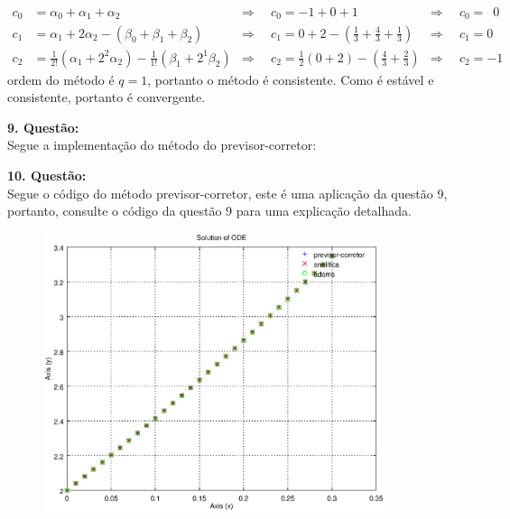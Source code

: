\documentclass[a4paper,12pt]{article}
\begin{document}
	\begin{align*}
		c_{0} &= \alpha_{0} + \alpha_{1} + \alpha_{2} &\Rightarrow \hspace{6pt} &c_{0} = -1 + 0 + 1 &\Rightarrow
		\hspace{2pt} &c_{0} =
		\hspace{6pt}0\\
		c_{1} &= \alpha_{1} + 2\alpha_{2} -(\beta_{0} + \beta_{1} + \beta_{2}) &\Rightarrow \hspace{6pt} &c_{1} = 0 +
		2 - (\frac{1}{3} + \frac{4}{3} + \frac{1}{3}) &\Rightarrow \hspace{2pt} &c_{1} = 0\\
		c_{2} &= \frac{1}{2!}(\alpha_{1} + 2^{2}\alpha_{2}) - \frac{1}{1!}(\beta_{1} + 2^{1}\beta_{2}) &\Rightarrow
		\hspace{6pt} &c_{2} = \frac{1}{2}(0 + 2)-(\frac{4}{3} + \frac{2}{3}) &\Rightarrow \hspace{6pt} &c_{2} = -1 
	\end{align*}
ordem do m\'etodo \'e $q = 1$, portanto o m\'etodo \'e consistente. Como \'e est\'avel e consistente, portanto \'e
convergente. 

\textbf{9. Quest\~ao:}\\
Segue a implementa\c c\~ao do m\'etodo do previsor-corretor:


\textbf{10. Quest\~ao:}\\
Segue o c\'odigo do m\'etodo previsor-corretor, este \'e uma aplica\c c\~ao da quest\~ao 9, portanto, consulte o
c\'odigo  da quest\~ao 9 para uma explica\c c\~ao detalhada.

\begin{figure}[!h]
	\centering
	\includegraphics[width= 10cm]{plot6.eps}
\end{figure}
\end{document}
